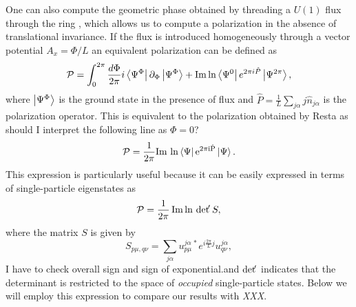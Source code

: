 \documentclass[twocolumn,amsmath,longbibliography,amssymb,superscriptaddress]{revtex4-1}
\newcommand{\carlos}[1]{{\color{red} #1}}
\newcommand{\maria}[1]{{\color{blue} #1}}
\newcommand{\mariac}[1]{{\it\color{cyan}#1}}
\begin{document}
One can also compute the geometric phase obtained by threading a $U(1)$ flux through the ring \cite{Watanabe2018}, which allows us to compute a polarization in the absence of translational invariance. If the flux is introduced homogeneously through a vector potential $A_x = \Phi/L$ an equivalent polarization can be defined as
\begin{equation}
\mathcal{P} = \int_0^{2\pi}\frac{d\Phi}{2\pi} i\bra{\Psi^\Phi}\partial_\Phi \ket{\Psi^\Phi} + \Im\ln \bra{\Psi^0}e^{2\pi i \hat{P}} \ket{\Psi^{2\pi}}, 
\end{equation}
where $\ket{\Psi^{\Phi}}$ is the ground state in the presence of flux and $\hat{P}=\frac{1}{L}\sum_{j\alpha} j\hat{n}_{j\alpha}$ is the polarization operator. This is equivalent to the polarization obtained by Resta \cite{Resta1997} as
\maria{should I interpret the following line as $\Phi=0$?}
\begin{align}
\mathcal{P} = \frac{1}{2\pi} \rm{ Im }\,\ln\bra{\Psi}e^{2\pi i \hat{P}}\ket{\Psi}.
\end{align}
This expression is particularly useful because it can be easily expressed in terms of single-particle eigenstates as
\begin{align}
\mathcal{P} = \frac{1}{2\pi}\Im \ln \, {\rm det }\!' \, S,
\label{eq:polarization_resta}
\end{align}
where the matrix $S$ is given by
\begin{equation}
S_{p\mu,q\nu} = \sum_{j\alpha} u_{p\mu}^{j \alpha \, \ast} e^{i\frac{2\pi}{L}j}u_{q\nu}^{j \alpha},
\end{equation}
\carlos{I have to check overall sign and sign of exponential.}and  ${\rm det }\!' $ indicates that the determinant is restricted to the space of \emph{occupied} single-particle states. Below we will employ this expression to compare our results with \mariac{XXX}.
\end{document}
